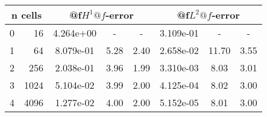 \documentclass[10pt]{report}
\begin{document}
\begin{table}[H]
\begin{center}
\begin{tabular}{|c|r|c|c|c|c|c|c|} \hline

\multicolumn{2}{|c|}{n cells} & 
\multicolumn{3}{|c|}{@f$H^1@f$-error} & 
\multicolumn{3}{|c|}{@f$L^2@f$-error}\\ \hline
0 & 16 & 4.264e+00 & - & - & 3.109e-01 & - & -\\ \hline
1 & 64 & 8.079e-01 & 5.28 & 2.40 & 2.658e-02 & 11.70 & 3.55\\ \hline
2 & 256 & 2.038e-01 & 3.96 & 1.99 & 3.310e-03 & 8.03 & 3.01\\ \hline
3 & 1024 & 5.104e-02 & 3.99 & 2.00 & 4.125e-04 & 8.02 & 3.00\\ \hline
4 & 4096 & 1.277e-02 & 4.00 & 2.00 & 5.152e-05 & 8.01 & 3.00\\ \hline
\end{tabular}
\end{center}
\end{table}
\end{document}
